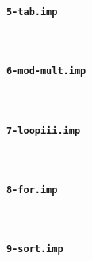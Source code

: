 \documentclass[12pt,a4paper]{article}
\begin{document}


\paragraph{\tt 5-tab.imp} \



\paragraph{\tt 6-mod-mult.imp} \



\paragraph{\tt 7-loopiii.imp} \



\paragraph{\tt 8-for.imp} \



\paragraph{\tt 9-sort.imp} \


\end{document}
